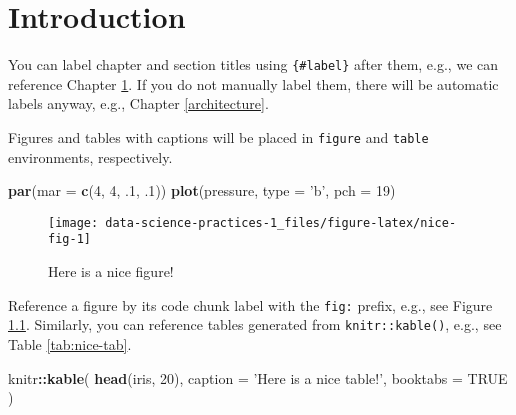 \documentclass[]{book}
\newenvironment{Shaded}{\begin{snugshade}}{\end{snugshade}}
\newcommand{\DataTypeTok}[1]{\textcolor[rgb]{0.13,0.29,0.53}{#1}}
\newcommand{\DecValTok}[1]{\textcolor[rgb]{0.00,0.00,0.81}{#1}}
\newcommand{\FloatTok}[1]{\textcolor[rgb]{0.00,0.00,0.81}{#1}}
\newcommand{\KeywordTok}[1]{\textcolor[rgb]{0.13,0.29,0.53}{\textbf{#1}}}
\newcommand{\NormalTok}[1]{#1}
\newcommand{\OperatorTok}[1]{\textcolor[rgb]{0.81,0.36,0.00}{\textbf{#1}}}
\newcommand{\OtherTok}[1]{\textcolor[rgb]{0.56,0.35,0.01}{#1}}
\newcommand{\StringTok}[1]{\textcolor[rgb]{0.31,0.60,0.02}{#1}}
\begin{document}
\hypertarget{intro}{%
\chapter{Introduction}\label{intro}}

You can label chapter and section titles using \texttt{\{\#label\}} after them, e.g., we can reference Chapter \ref{intro}. If you do not manually label them, there will be automatic labels anyway, e.g., Chapter \ref{architecture}.

Figures and tables with captions will be placed in \texttt{figure} and \texttt{table} environments, respectively.

\begin{Shaded}
\begin{Highlighting}[]
\KeywordTok{par}\NormalTok{(}\DataTypeTok{mar =} \KeywordTok{c}\NormalTok{(}\DecValTok{4}\NormalTok{, }\DecValTok{4}\NormalTok{, }\FloatTok{.1}\NormalTok{, }\FloatTok{.1}\NormalTok{))}
\KeywordTok{plot}\NormalTok{(pressure, }\DataTypeTok{type =} \StringTok{'b'}\NormalTok{, }\DataTypeTok{pch =} \DecValTok{19}\NormalTok{)}
\end{Highlighting}
\end{Shaded}

\begin{figure}

{\centering \texttt{[image: data-science-practices-1\_files/figure-latex/nice-fig-1]} 

}

\caption{Here is a nice figure!}\label{fig:nice-fig}
\end{figure}

Reference a figure by its code chunk label with the \texttt{fig:} prefix, e.g., see Figure \ref{fig:nice-fig}. Similarly, you can reference tables generated from \texttt{knitr::kable()}, e.g., see Table \ref{tab:nice-tab}.

\begin{Shaded}
\begin{Highlighting}[]
\NormalTok{knitr}\OperatorTok{::}\KeywordTok{kable}\NormalTok{(}
  \KeywordTok{head}\NormalTok{(iris, }\DecValTok{20}\NormalTok{), }\DataTypeTok{caption =} \StringTok{'Here is a nice table!'}\NormalTok{,}
  \DataTypeTok{booktabs =} \OtherTok{TRUE}
\NormalTok{)}
\end{Highlighting}
\end{Shaded}
\end{document}
